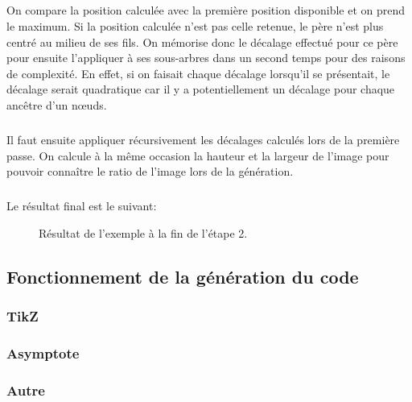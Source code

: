 \subparagraph{}On compare la position calculée avec la première position disponible et on prend le maximum. Si la position calculée n'est pas celle retenue, le père n'est plus centré au milieu de ses fils. On mémorise donc le décalage effectué pour ce père pour ensuite l'appliquer à ses sous-arbres dans un second temps pour des raisons de complexité. En effet, si on faisait chaque décalage lorsqu'il se présentait, le décalage serait quadratique car il y a potentiellement un décalage pour chaque ancêtre d'un n\oe uds.
	


\subparagraph{}Il faut ensuite appliquer récursivement les décalages calculés lors de la première passe. On calcule à la même occasion la hauteur et la largeur de l'image pour pouvoir connaître le ratio de l'image lors de la génération.



\subparagraph{}Le résultat final est le suivant:

\begin{figure}[h] \centering \resizebox {!}{5cm} {
}
\caption{Résultat de l'exemple à la fin de l'étape 2.}
\end{figure}

	\subsection{Fonctionnement de la génération du code}
	
		\subsubsection*{TikZ}

		
		\subsubsection*{Asymptote}

		
		\subsubsection*{Autre}


